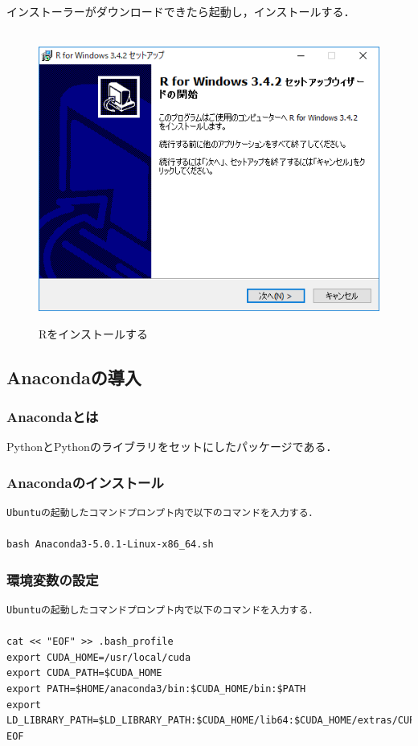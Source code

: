 インストーラーがダウンロードできたら起動し，インストールする．

\begin{figure}[h]
\centering　
\includegraphics[width=13cm]{Rinst1.png}
\caption{Rをインストールする}
\end{figure}

\newpage
\subsection{Anacondaの導入}
\subsubsection{Anacondaとは}
PythonとPythonのライブラリをセットにしたパッケージである．
\subsubsection{Anacondaのインストール}
\begin{verbatim}
Ubuntuの起動したコマンドプロンプト内で以下のコマンドを入力する．

bash Anaconda3-5.0.1-Linux-x86_64.sh
\end{verbatim}
\subsubsection{環境変数の設定}
\begin{verbatim}
Ubuntuの起動したコマンドプロンプト内で以下のコマンドを入力する．

cat << "EOF" >> .bash_profile
export CUDA_HOME=/usr/local/cuda
export CUDA_PATH=$CUDA_HOME
export PATH=$HOME/anaconda3/bin:$CUDA_HOME/bin:$PATH
export LD_LIBRARY_PATH=$LD_LIBRARY_PATH:$CUDA_HOME/lib64:$CUDA_HOME/extras/CUPTI/lib64
EOF
\end{verbatim}
\newpage
